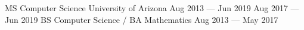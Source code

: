 
\vspace{-0.2cm}
\begin{cventries}
  \cventry
    {MS Computer Science} %
    {University of Arizona} %
    {Aug 2013 --- Jun 2019} %
    {Aug 2017 --- Jun 2019} %
    {}
    \vspace{-.55cm}
    \cventry
    {BS Computer Science / BA Mathematics} %
    {} %
    {} %
    {Aug 2013 --- May 2017} %
    {}
  
\end{cventries}
